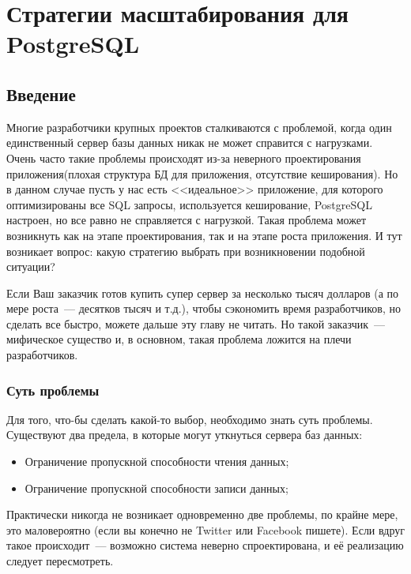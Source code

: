 \chapter{Стратегии масштабирования для PostgreSQL}
\begin{epigraphs}
\end{epigraphs}

\section{Введение}
Многие разработчики крупных проектов сталкиваются с проблемой, когда один единственный сервер 
базы данных никак не может справится с нагрузками. Очень часто такие проблемы происходят из-за 
неверного проектирования приложения(плохая структура БД для приложения, отсутствие кеширования). Но в данном 
случае пусть у нас есть <<идеальное>> приложение, для которого оптимизированы все SQL запросы, используется кеширование, 
PostgreSQL настроен, но все равно не справляется с нагрузкой. Такая проблема может возникнуть как на этапе проектирования, 
так и на этапе роста приложения. И тут возникает вопрос: какую стратегию выбрать при возникновении подобной ситуации?

Если Ваш заказчик готов купить супер сервер за несколько тысяч долларов 
(а по мере роста~--- десятков тысяч и т.д.), чтобы сэкономить время разработчиков, но сделать все быстро, 
можете дальше эту главу не читать. Но такой заказчик~--- мифическое существо и, в основном, такая проблема 
ложится на плечи разработчиков.

\subsection{Суть проблемы}

Для того, что-бы сделать какой-то выбор, необходимо знать суть проблемы. 
Существуют два предела, в которые могут уткнуться сервера баз данных:

\begin{itemize}
\item Ограничение пропускной способности чтения данных;
\item Ограничение пропускной способности записи данных;
\end{itemize}

Практически никогда не возникает одновременно две проблемы, по крайне мере, это маловероятно (если вы конечно не Twitter 
или Facebook пишете). Если вдруг такое происходит~--- возможно система неверно спроектирована, и её реализацию следует пересмотреть.

